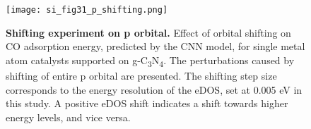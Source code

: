 \begin{figure}
  \centering
  \texttt{[image: si\_fig31\_p\_shifting.png]}
  \caption{\textbf{Shifting experiment on p orbital.}
  Effect of orbital shifting on CO adsorption energy, predicted by the CNN model,
  for single metal atom catalysts supported on g-C\textsubscript{3}N\textsubscript{4}.
  The perturbations caused by shifting of entire p orbital are presented.
  The shifting step size corresponds to the energy resolution of the eDOS, set at 0.005 eV in this study.
  A positive eDOS shift indicates a shift towards higher energy levels, and vice versa.}
  \label{si_fig31:p_shifting}
\end{figure}
